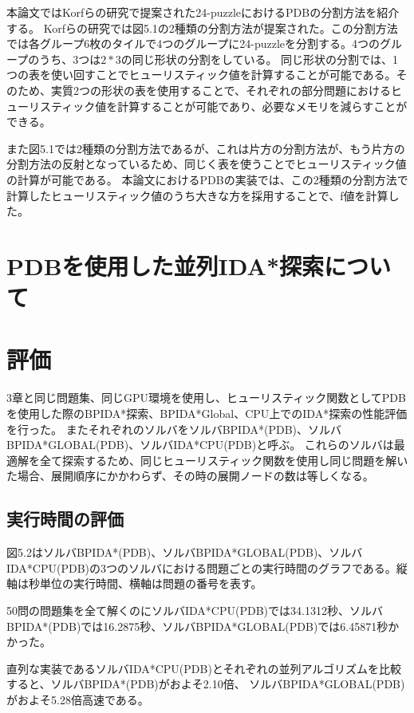 \documentclass[a4paper,11pt,oneside,openany]{jsbook}
\begin{document}
本論文ではKorfらの研究\cite{KF02}で提案された24-puzzleにおけるPDBの分割方法を紹介する。
Korfらの研究\cite{KF02}では図5.1の2種類の分割方法が提案された。この分割方法では各グループ6枚のタイルで4つのグループに24-puzzleを分割する。4つのグループのうち、3つは$2*3$の同じ形状の分割をしている。
同じ形状の分割では、1つの表を使い回すことでヒューリスティック値を計算することが可能である。そのため、実質2つの形状の表を使用することで、それぞれの部分問題におけるヒューリスティック値を計算することが可能であり、必要なメモリを減らすことができる。

また図5.1では2種類の分割方法であるが、これは片方の分割方法が、もう片方の分割方法の反射となっているため、同じく表を使うことでヒューリスティック値の計算が可能である。
本論文におけるPDBの実装では、この2種類の分割方法で計算したヒューリスティック値のうち大きな方を採用することで、f値を計算した。




\section{PDBを使用した並列IDA*探索について}
\section{評価}
3章と同じ問題集、同じGPU環境を使用し、ヒューリスティック関数としてPDBを使用した際のBPIDA*探索、BPIDA*Global、CPU上でのIDA*探索の性能評価を行った。
またそれぞれのソルバをソルバBPIDA*(PDB)、ソルバBPIDA*GLOBAL(PDB)、ソルバIDA*CPU(PDB)と呼ぶ。
これらのソルバは最適解を全て探索するため、同じヒューリスティック関数を使用し同じ問題を解いた場合、展開順序にかかわらず、その時の展開ノードの数は等しくなる。

\subsection{実行時間の評価}

図5.2はソルバBPIDA*(PDB)、ソルバBPIDA*GLOBAL(PDB)、ソルバIDA*CPU(PDB)の3つのソルバにおける問題ごとの実行時間のグラフである。縦軸は秒単位の実行時間、横軸は問題の番号を表す。

50問の問題集を全て解くのにソルバIDA*CPU(PDB)では34.1312秒、ソルバBPIDA*(PDB)では16.2875秒、ソルバBPIDA*GLOBAL(PDB)では6.45871秒かかった。

直列な実装であるソルバIDA*CPU(PDB)とそれぞれの並列アルゴリズムを比較すると、ソルバBPIDA*(PDB)がおよそ2.10倍、
ソルバBPIDA*GLOBAL(PDB)がおよそ5.28倍高速である。
\end{document}
